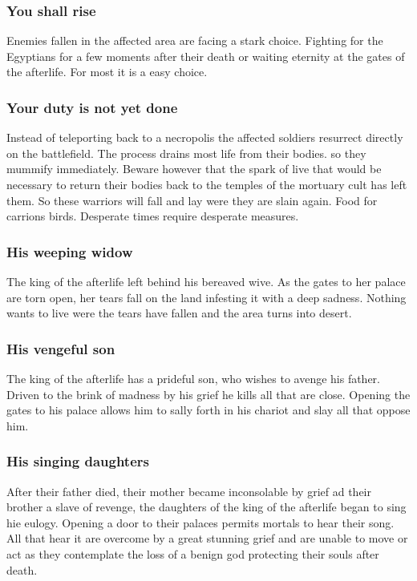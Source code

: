 \documentclass[a4paper]{book}
\begin{document}
		\subsubsection{You shall rise}
			Enemies fallen in the affected area are facing a stark choice.
			Fighting for the \gls{Egyptians} for a few moments after their death
			or waiting eternity at the gates of the afterlife.
			For most it is a easy choice.

		\subsubsection{Your duty is not yet done}
			Instead of teleporting back to a necropolis the affected soldiers
			resurrect directly on the battlefield.
			The process drains most life from their bodies.
			so they mummify immediately.
			Beware however that the spark of live that would be necessary
			to return their bodies back to the temples of the mortuary cult
			has left them.
			So these warriors will fall and lay were they are slain again.
			Food for carrions birds.
			Desperate times require desperate measures.

		\subsubsection{His weeping widow}
			The king of the afterlife left behind his bereaved wive.
			As the gates to her palace are torn open,
			her tears fall on the land infesting it with a deep sadness.
			Nothing wants to live were the tears have fallen and the area turns into desert.

		\subsubsection{His vengeful son}
			The king of the afterlife has a prideful son,
			who wishes to avenge his father.
			Driven to the brink of madness by his grief he kills all that are close.
			Opening the gates to his palace allows him to sally forth in his chariot
			and slay all that oppose him.

		\subsubsection{His singing daughters}
			After their father died, their mother became inconsolable by grief
			ad their brother a slave of revenge,
			the daughters of the king of the afterlife began to sing hie eulogy.
			Opening a door to their palaces permits mortals to hear their song.
			All that hear it are overcome by a great stunning grief
			and are unable to move or act as they contemplate the loss
			of a benign god protecting their souls after death.
\end{document}
